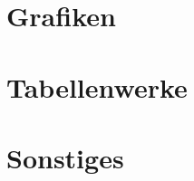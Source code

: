 
\appendixtoc
\renewcommand\thechapter{\Alph{chapter}}
\setcounter{chapter}{0}

%  
%
%


\chapter{Grafiken}

\chapter{Tabellenwerke}

\chapter{Sonstiges}


